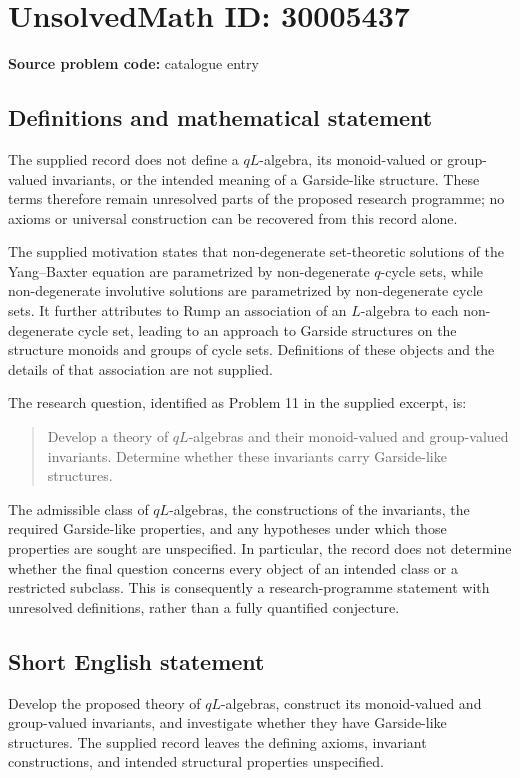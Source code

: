 \documentclass[11pt]{article}
\begin{document}
\section*{UnsolvedMath ID: 30005437}
\textbf{Source problem code:} catalogue entry
\subsection{Definitions and mathematical statement}
The supplied record does not define a \(qL\)-algebra, its monoid-valued or group-valued invariants, or the intended meaning of a Garside-like structure. These terms therefore remain unresolved parts of the proposed research programme; no axioms or universal construction can be recovered from this record alone.

The supplied motivation states that non-degenerate set-theoretic solutions of the Yang--Baxter equation are parametrized by non-degenerate \(q\)-cycle sets, while non-degenerate involutive solutions are parametrized by non-degenerate cycle sets. It further attributes to Rump an association of an \(L\)-algebra to each non-degenerate cycle set, leading to an approach to Garside structures on the structure monoids and groups of cycle sets. Definitions of these objects and the details of that association are not supplied.

The research question, identified as Problem 11 in the supplied excerpt, is:
\begin{quote}
Develop a theory of \(qL\)-algebras and their monoid-valued and group-valued invariants. Determine whether these invariants carry Garside-like structures.
\end{quote}
The admissible class of \(qL\)-algebras, the constructions of the invariants, the required Garside-like properties, and any hypotheses under which those properties are sought are unspecified. In particular, the record does not determine whether the final question concerns every object of an intended class or a restricted subclass. This is consequently a research-programme statement with unresolved definitions, rather than a fully quantified conjecture.
\subsection{Short English statement}
Develop the proposed theory of \(qL\)-algebras, construct its monoid-valued and group-valued invariants, and investigate whether they have Garside-like structures. The supplied record leaves the defining axioms, invariant constructions, and intended structural properties unspecified.
\end{document}
